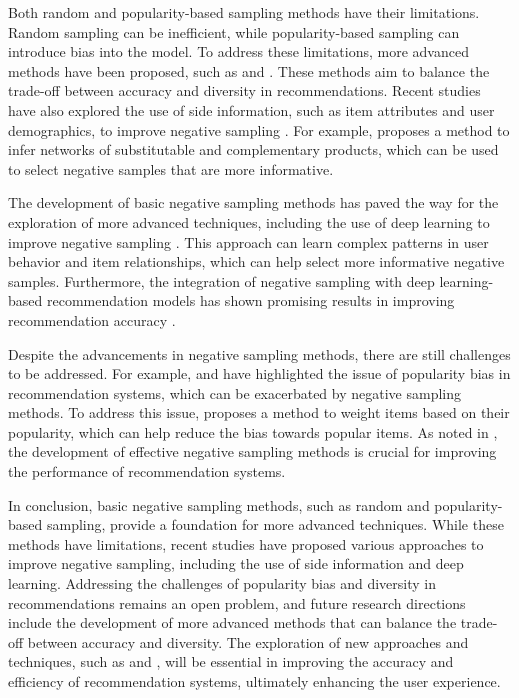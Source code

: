 \documentclass[11pt,a4paper]{article}
\begin{document}
Both random and popularity-based sampling methods have their limitations. Random sampling can be inefficient, while popularity-based sampling can introduce bias into the model. To address these limitations, more advanced methods have been proposed, such as \cite{doi:10.1073/pnas.1000488107} and \cite{doi:10.1007/s10115-014-0779-2}. These methods aim to balance the trade-off between accuracy and diversity in recommendations. Recent studies have also explored the use of side information, such as item attributes and user demographics, to improve negative sampling \cite{doi:10.1016/j.elerap.2019.100879}. For example, \cite{doi:10.1145/2783258.2783381} proposes a method to infer networks of substitutable and complementary products, which can be used to select negative samples that are more informative.

The development of basic negative sampling methods has paved the way for the exploration of more advanced techniques, including the use of deep learning to improve negative sampling \cite{arxiv:1707.07435}. This approach can learn complex patterns in user behavior and item relationships, which can help select more informative negative samples. Furthermore, the integration of negative sampling with deep learning-based recommendation models has shown promising results in improving recommendation accuracy \cite{doi:10.1145/3366423.3380303}.

Despite the advancements in negative sampling methods, there are still challenges to be addressed. For example, \cite{arxiv:1907.13286} and \cite{arxiv:1901.07555} have highlighted the issue of popularity bias in recommendation systems, which can be exacerbated by negative sampling methods. To address this issue, \cite{arxiv:1802.05382} proposes a method to weight items based on their popularity, which can help reduce the bias towards popular items. As noted in \cite{arxiv:1905.01997}, the development of effective negative sampling methods is crucial for improving the performance of recommendation systems.

In conclusion, basic negative sampling methods, such as random and popularity-based sampling, provide a foundation for more advanced techniques. While these methods have limitations, recent studies have proposed various approaches to improve negative sampling, including the use of side information and deep learning. Addressing the challenges of popularity bias and diversity in recommendations remains an open problem, and future research directions include the development of more advanced methods that can balance the trade-off between accuracy and diversity. The exploration of new approaches and techniques, such as \cite{arxiv:2210.10629} and \cite{doi:10.1145/3466753}, will be essential in improving the accuracy and efficiency of recommendation systems, ultimately enhancing the user experience.
\end{document}
